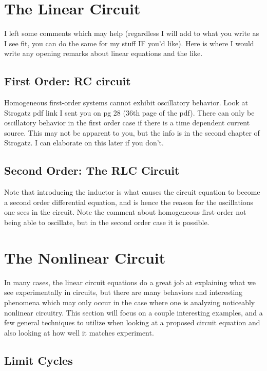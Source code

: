 \documentclass[12pt]{article}
\begin{document}
\section{The Linear Circuit}

I left some comments which may help (regardless I will add to what you write as I see fit, you can do the same for my stuff IF you'd like).  Here is where I would write any opening remarks about linear equations and the like.

\subsection{First Order: RC circuit}

Homogeneous first-order systems cannot exhibit oscillatory behavior. Look at Strogatz pdf link I sent you on pg 28 (36th page of the pdf).  There can only be oscillatory behavior in the first order case if there is a time dependent current source.  This may not be apparent to you, but the info is in the second chapter of Strogatz.  I can elaborate on this later if you don't.

\subsection{Second Order: The RLC Circuit}

Note that introducing the inductor is what causes the circuit equation to become a second order differential equation, and is hence the reason for the oscillations one sees in the circuit.  Note the comment about homogeneous first-order not being able to oscillate, but in the second order case it is possible.


\section{The Nonlinear Circuit}

In many cases, the linear circuit equations do a great job at explaining what we see experimentally in circuits, but there are many behaviors and interesting phenomena which may only occur in the case where one is analyzing noticeably nonlinear circuitry.  This section will focus on a couple interesting examples, and a few general techniques to utilize when looking at a proposed circuit equation and also looking at how well it matches experiment.

\subsection{Limit Cycles}
\end{document}
